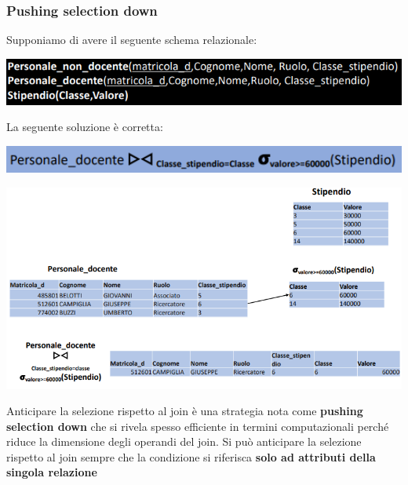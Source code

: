 \documentclass[12pt]{article}
\begin{document}
\subsubsection{Pushing selection down}
Supponiamo di avere il seguente schema relazionale:
\begin{center}
    \includegraphics[width =1\textwidth]{Images/148.PNG}
\end{center} 
La seguente soluzione è corretta:
\begin{center}
    \includegraphics[width =1\textwidth]{Images/149.PNG}
\end{center}
\begin{center}
    \includegraphics[width =1.10\textwidth]{Images/150.PNG}
\end{center}
Anticipare la selezione rispetto al join è una strategia nota come \textbf{pushing selection down} che si rivela spesso efficiente in termini computazionali perché riduce la dimensione degli operandi del join.
Si può anticipare la selezione rispetto al join sempre che la condizione si riferisca \textbf{solo ad attributi della singola relazione}
\end{document}
